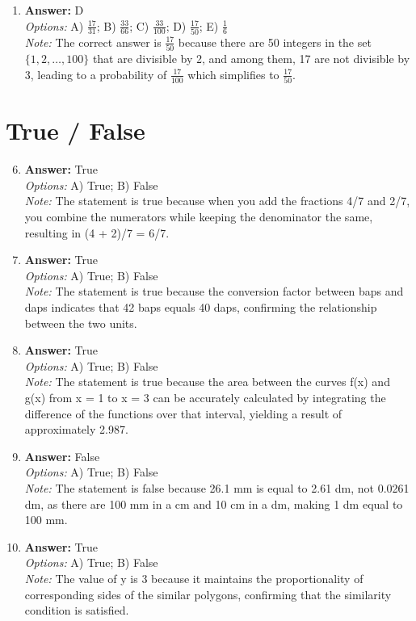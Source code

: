 \documentclass[12pt]{article}
\begin{document}
\begin{enumerate}[label=\arabic*.]
\\ \textit{Note:} The expressions 4(2 x - 6) and 8 x - 24 are equivalent because, when the distributive property is applied to the first expression, it simplifies to 8 x - 24, demonstrating that they represent the same linear function.
\item \textbf{Answer:} D
\\ \textit{Options:} A) \ensuremath{\frac{17}{31}}; B) \ensuremath{\frac{33}{66}}; C) \ensuremath{\frac{33}{100}}; D) \ensuremath{\frac{17}{50}}; E) \ensuremath{\frac{1}{6}}
\\ \textit{Note:} The correct answer is \(\frac{17}{50}\) because there are 50 integers in the set \(\{1,2,\ldots,100\}\) that are divisible by 2, and among them, 17 are not divisible by 3, leading to a probability of \(\frac{17}{100}\) which simplifies to \(\frac{17}{50}\).
\end{enumerate}

\section*{True / False}
\begin{enumerate}[label=\arabic*.]
\setcounter{enumi}{5}
\item \textbf{Answer:} True
\\ \textit{Options:} A) True; B) False
\\ \textit{Note:} The statement is true because when you add the fractions 4/7 and 2/7, you combine the numerators while keeping the denominator the same, resulting in (4 + 2)/7 = 6/7.
\item \textbf{Answer:} True
\\ \textit{Options:} A) True; B) False
\\ \textit{Note:} The statement is true because the conversion factor between baps and daps indicates that 42 baps equals 40 daps, confirming the relationship between the two units.
\item \textbf{Answer:} True
\\ \textit{Options:} A) True; B) False
\\ \textit{Note:} The statement is true because the area between the curves f(x) and g(x) from x = 1 to x = 3 can be accurately calculated by integrating the difference of the functions over that interval, yielding a result of approximately 2.987.
\item \textbf{Answer:} False
\\ \textit{Options:} A) True; B) False
\\ \textit{Note:} The statement is false because 26.1 mm is equal to 2.61 dm, not 0.0261 dm, as there are 100 mm in a cm and 10 cm in a dm, making 1 dm equal to 100 mm.
\item \textbf{Answer:} True
\\ \textit{Options:} A) True; B) False
\\ \textit{Note:} The value of y is 3 because it maintains the proportionality of corresponding sides of the similar polygons, confirming that the similarity condition is satisfied.
\end{enumerate}
\end{document}
